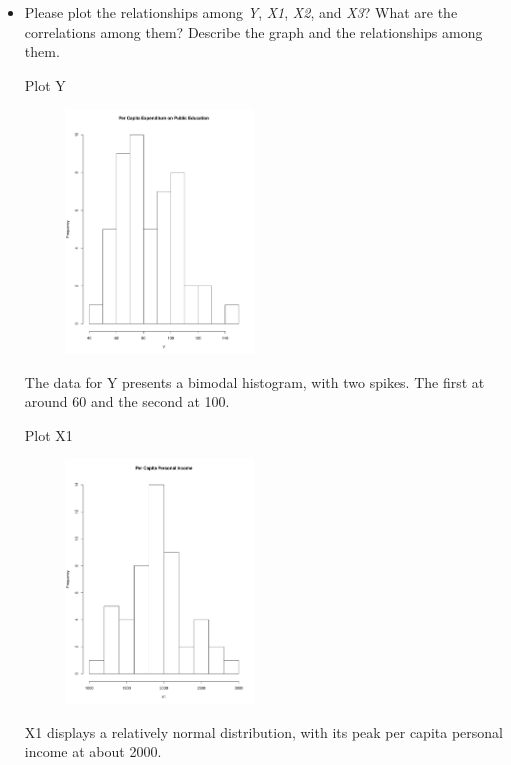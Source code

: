 \documentclass[12pt,letterpaper]{article}
\begin{document}
\vspace{1cm}
\begin{itemize}

\item

Please plot the relationships among \emph{Y}, \emph{X1}, \emph{X2}, and \emph{X3}? What are the correlations among them? Describe the graph and the relationships among them.
\vspace{.5cm}

\noindent Plot Y
  
\begin{figure}
\includegraphics[width=50mm,scale=0.5]{Y.pdf}
\end{figure} 
\noindent The data for Y presents a bimodal histogram, with two spikes. The first at around 60 and the second at 100. 
\vspace{.5cm}

\noindent Plot X1

\begin{figure}
\includegraphics[width=50mm,scale=0.5]{X1.pdf}
\end{figure} 
\noindent X1 displays a relatively normal distribution, with its peak per capita personal income at about 2000. 


\end{itemize}
\end{document}

